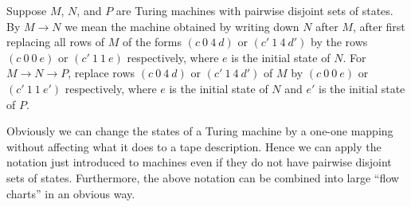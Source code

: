 Suppose $M$, $N$, and $P$ are Turing machines with pairwise disjoint sets of states. By $M \rightarrow N$ we mean the machine obtained by writing down $N$ after $M$, after first replacing all rows of $M$ of the forms $(c \ 0 \ 4 \ d)$ or $(c' \ 1 \ 4 \ d')$ by the rows $(c \ 0 \ 0 \ e)$ or $(c' \ 1 \ 1 \ e)$ respectively, where $e$ is the initial state of $N$. For $M \rightarrow N \rightarrow P$, replace rows $(c \ 0 \ 4 \ d)$ or $(c' \ 1 \ 4 \ d')$ of $M$ by $(c \ 0 \ 0 \ e)$ or $(c' \ 1 \ 1 \ e')$ respectively, where $e$ is the initial state of $N$ and $e'$ is the initial state of $P$.

Obviously we can change the states of a Turing machine by a one-one mapping without affecting what it does to a tape description. Hence we can apply the notation just introduced to machines even if they do not have pairwise disjoint sets of states. Furthermore, the above notation can be combined into large ``flow charts'' in an obvious way.
